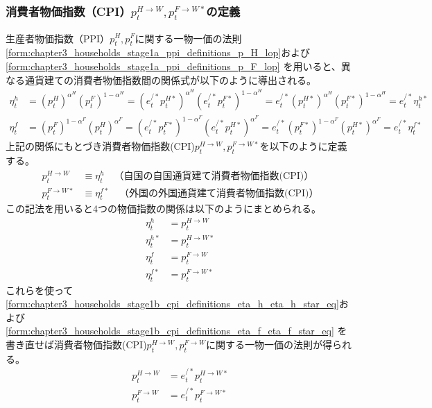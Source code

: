 \subsubsection{消費者物価指数（CPI）\(p_t^{H\to W}, p_t^{F\to W*}\)の定義}
\label{sec:chapter3_households_stage1b_cpi_definitions}
生産者物価指数（PPI）\(p_t^H, p_t^F\)に関する一物一価の法則
\eqref{form:chapter3_households_stage1a_ppi_definitions_p_H_lop}および
\eqref{form:chapter3_households_stage1a_ppi_definitions_p_F_lop}
を用いると、異なる通貨建ての消費者物価指数間の関係式が以下のように導出される。
\begin{align}
    \label{form:chapter3_households_stage1b_cpi_definitions_eta_h_eta_h_star_eq}
        \eta_t^h
        &=(p_t^H)^{\alpha^H}(p_t^F)^{1-\alpha^H}
        =(e_t^{/*}p_t^{H*})^{\alpha^H}(e_t^{/*}p_t^{F*})^{1-\alpha^H}
        =e_t^{/*}(p_t^{H*})^{\alpha^H}(p_t^{F*})^{1-\alpha^H}
        =e_t^{/*}\eta_t^{h*} \\
    \label{form:chapter3_households_stage1b_cpi_definitions_eta_f_eta_f_star_eq}
        \eta_t^f
        &=(p_t^F)^{1-\alpha^F}(p_t^H)^{\alpha^F}
        =(e_t^{/*}p_t^{F*})^{1-\alpha^F}(e_t^{/*}p_t^{H*})^{\alpha^F}
        =e_t^{/*}(p_t^{F*})^{1-\alpha^F}(p_t^{H*})^{\alpha^F}
        =e_t^{/*}\eta_t^{f*}
\end{align}
上記の関係にもとづき消費者物価指数(CPI)\(p_t^{H\to W}, p_t^{F\to W*}\)を以下のように定義する。
\begin{align}
    \label{form:chapter3_households_stage1b_cpi_definitions_p_H_W_def}
        p_t^{H\to W}&\equiv\eta_t^h\quad\text{（自国の自国通貨建て消費者物価指数(CPI)）} \\
    \label{form:chapter3_households_stage1b_cpi_definitions_p_F_W_star_def}
        p_t^{F\to W*}&\equiv\eta_t^{f*}\quad\text{（外国の外国通貨建て消費者物価指数(CPI)）}
\end{align}
この記法を用いると4つの物価指数の関係は以下のようにまとめられる。
\begin{align}
    \label{form:chapter3_households_stage1b_cpi_definitions_eta_h_p_H_W_eq}
        \eta_t^h&=p_t^{H\to W} \\
    \label{form:chapter3_households_stage1b_cpi_definitions_eta_h_star_p_H_W_star_eq}
        \eta_t^{h*}&=p_t^{H\to W*} \\
    \label{form:chapter3_households_stage1b_cpi_definitions_eta_f_p_F_W_eq}
        \eta_t^f&=p_t^{F\to W} \\
    \label{form:chapter3_households_stage1b_cpi_definitions_eta_f_star_p_F_W_star_eq}
        \eta_t^{f*}&=p_t^{F\to W*}
\end{align}
これらを使って
\eqref{form:chapter3_households_stage1b_cpi_definitions_eta_h_eta_h_star_eq}および
\eqref{form:chapter3_households_stage1b_cpi_definitions_eta_f_eta_f_star_eq}
を書き直せば消費者物価指数(CPI)\(p_t^{H\to W}, p_t^{F\to W}\)に関する一物一価の法則が得られる。
\begin{align}
    \label{form:chapter3_households_stage1b_cpi_definitions_p_H_W_lop}
        p_t^{H\to W}&=e_t^{/*}p_t^{H\to W*} \\
    \label{form:chapter3_households_stage1b_cpi_definitions_p_F_W_lop}
        p_t^{F\to W}&=e_t^{/*}p_t^{F\to W*}
\end{align}

